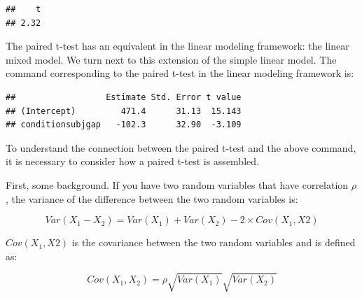\documentclass[12pt,]{krantz}
\newenvironment{Shaded}{\begin{snugshade}}{\end{snugshade}}
\newcommand{\DataTypeTok}[1]{\textcolor[rgb]{0.13,0.29,0.53}{#1}}
\newcommand{\DecValTok}[1]{\textcolor[rgb]{0.00,0.00,0.81}{#1}}
\newcommand{\KeywordTok}[1]{\textcolor[rgb]{0.13,0.29,0.53}{\textbf{#1}}}
\newcommand{\NormalTok}[1]{#1}
\newcommand{\OperatorTok}[1]{\textcolor[rgb]{0.81,0.36,0.00}{\textbf{#1}}}
\newcommand{\OtherTok}[1]{\textcolor[rgb]{0.56,0.35,0.01}{#1}}
\newcommand{\StringTok}[1]{\textcolor[rgb]{0.31,0.60,0.02}{#1}}
\begin{document}
\begin{Shaded}
\end{Shaded}

\begin{verbatim}
##    t 
## 2.32
\end{verbatim}

The paired t-test has an equivalent in the linear modeling framework: the linear mixed model. We turn next to this extension of the simple linear model. The command corresponding to the paired t-test in the linear modeling framework is:

\begin{Shaded}
\end{Shaded}

\begin{verbatim}
##                  Estimate Std. Error t value
## (Intercept)         471.4      31.13  15.143
## conditionsubjgap   -102.3      32.90  -3.109
\end{verbatim}

To understand the connection between the paired t-test and the above command, it is necessary to consider how a paired t-test is assembled.

First, some background. If you have two random variables that have correlation \(\rho\), the variance of the difference between the two random variables is:

\begin{equation}
Var(X_1-X_2)=Var(X_1) + Var(X_2) - 2\times Cov(X_1, X2)
\end{equation}

\(Cov(X_1, X2)\) is the covariance between the two random variables and is defined as:

\begin{equation}
Cov(X_1, X_2) = \rho \sqrt{Var(X_1)}\sqrt{Var(X_2)}
\end{equation}
\end{document}
